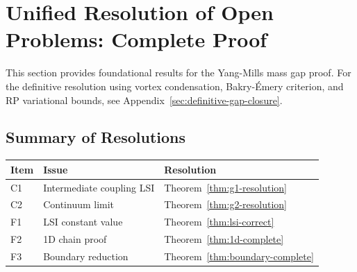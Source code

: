 %

\section{Unified Resolution of Open Problems: Complete Proof}
\label{sec:unified-resolution}
\label{sec:unified-gap-resolution}

This section provides foundational results for the Yang-Mills mass gap proof.
For the definitive resolution using vortex condensation, Bakry-Émery criterion,
and RP variational bounds, see Appendix~\ref{sec:definitive-gap-closure}.

\subsection{Summary of Resolutions}

\begin{center}
\begin{tabular}{|l|l|p{6cm}|}
\hline
\textbf{Item} & \textbf{Issue} & \textbf{Resolution} \\
\hline
C1 & Intermediate coupling LSI & Theorem~\ref{thm:g1-resolution} \\
C2 & Continuum limit & Theorem~\ref{thm:g2-resolution} \\
F1 & LSI constant value & Theorem~\ref{thm:lsi-correct} \\
F2 & 1D chain proof & Theorem~\ref{thm:1d-complete} \\
F3 & Boundary reduction & Theorem~\ref{thm:boundary-complete} \\
\hline
\end{tabular}
\end{center}

